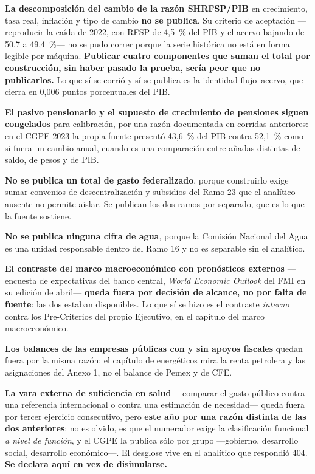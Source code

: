 \begin{list}{}{\setlength{\leftmargin}{1.4em}\setlength{\itemsep}{4pt}}
\item[$\bullet$] \textbf{La descomposición del cambio de la razón SHRFSP/PIB} en
crecimiento, tasa real, inflación y tipo de cambio \textbf{no se publica}. Su criterio de
aceptación ---reproducir la caída de 2022, con RFSP de 4,5~\% del PIB y el acervo bajando de
50,7 a 49,4~\%--- no se pudo correr porque la serie histórica no está en forma legible por
máquina. \textbf{Publicar cuatro componentes que suman el total por construcción, sin haber
pasado la prueba, sería peor que no publicarlos.} Lo que sí se corrió y sí se publica es la
identidad flujo--acervo, que cierra en 0,006 puntos porcentuales del PIB.
\item[$\bullet$] \textbf{El pasivo pensionario y el supuesto de crecimiento de pensiones
siguen congelados} para calibración, por una razón documentada en corridas anteriores: en el
CGPE 2023 la propia fuente presentó 43,6~\% del PIB contra 52,1~\% como si fuera un cambio
anual, cuando es una comparación entre añadas distintas de saldo, de pesos y de PIB.
\item[$\bullet$] \textbf{No se publica un total de gasto federalizado}, porque construirlo
exige sumar convenios de descentralización y subsidios del Ramo 23 que el analítico ausente
no permite aislar. Se publican los dos ramos por separado, que es lo que la fuente sostiene.
\item[$\bullet$] \textbf{No se publica ninguna cifra de agua}, porque la Comisión Nacional
del Agua es una unidad responsable dentro del Ramo 16 y no es separable sin el analítico.
\item[$\bullet$] \textbf{El contraste del marco macroeconómico con pronósticos externos}
---encuesta de expectativas del banco central, \emph{World Economic Outlook} del FMI en su
edición de abril--- \textbf{queda fuera por decisión de alcance, no por falta de fuente}:
las dos estaban disponibles. Lo que sí se hizo es el contraste \emph{interno} contra los
Pre-Criterios del propio Ejecutivo, en el capítulo del marco macroeconómico.
\item[$\bullet$] \textbf{Los balances de las empresas públicas con y sin apoyos fiscales}
quedan fuera por la misma razón: el capítulo de energéticos mira la renta petrolera y las
asignaciones del Anexo 1, no el balance de Pemex y de CFE.
\item[$\bullet$] \textbf{La vara externa de suficiencia en salud} ---comparar el gasto
público contra una referencia internacional o contra una estimación de necesidad--- queda
fuera por tercer ejercicio consecutivo, pero \textbf{este año por una razón distinta de las
dos anteriores}: no es olvido, es que el numerador exige la clasificación funcional \emph{a
nivel de función}, y el CGPE la publica sólo por grupo ---gobierno, desarrollo social,
desarrollo económico---. El desglose vive en el analítico que respondió 404. \textbf{Se
declara aquí en vez de disimularse.}
\end{list}


